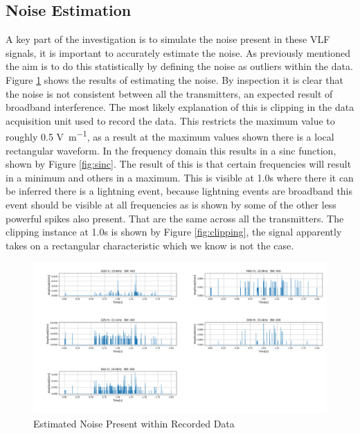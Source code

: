 \pagebreak
\subsection{Noise Estimation}\label{sec:noiseEst}
A key part of the investigation is to simulate the noise present in these VLF signals, it is important to accurately estimate the noise. As previously mentioned the aim is to do this statistically by defining the noise as outliers within the data. Figure \ref{fig:noise estimate} shows the results of estimating the noise. By inspection it is clear that the noise is not consistent between all the transmitters, an expected result of broadband interference. The most likely explanation of this is clipping in the data acquisition unit used to record the data. This restricts the maximum value to roughly 0.5 \si{\volt \per\metre}, as a result at the maximum values shown there is a local rectangular waveform. In the frequency domain this results in a sinc function, shown by Figure \ref{fig:sinc}. The result of this is that certain frequencies will result in a minimum and others in a maximum. This is visible at 1.0\si{\second} where there it can be inferred there is a lightning event, because lightning events are broadband this event should be visible at all frequencies as is shown by some of the other less powerful spikes also present. That are the same across all the transmitters. The clipping instance at 1.0\si{\second} is shown by Figure \ref{fig:clipping}, the signal apparently takes on a rectangular characteristic which we know is not the case.

\begin{figure}[h!]
    \centering
    \includegraphics[width = \textwidth]{figs/sig_character/noiseEstimate.png}
    \caption{Estimated Noise Present within Recorded Data}
    \label{fig:noise estimate}
\end{figure}

